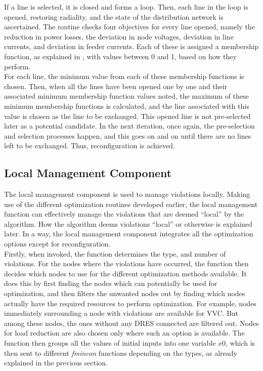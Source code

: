If a line is selected, it is closed and forms a loop. Then, each line in the loop is opened, restoring radiality, and the state of the distribution network is ascertained. The routine checks four objectives for every line opened, namely the reduction in power losses, the deviation in node voltages, deviation in line currents, and deviation in feeder currents. Each of these is assigned a membership function, as explained in , with values between 0 and 1, based on how they perform.\\

For each line, the minimum value from each of these membership functions is chosen. Then, when all the lines have been opened one by one and their associated minimum membership function values noted, the maximum of these minimum membership functions is calculated, and the line associated with this value is chosen as the line to be exchanged. This opened line is not pre-selected later as a potential candidate. In the next iteration, once again, the pre-selection and selection processes happen, and this goes on and on until there are no lines left to be exchanged. Thus, reconfiguration is achieved.

\subsection{Local Management Component}
The local management component is used to manage violations locally. Making use of the different optimization routines developed earlier, the local management function can effectively manage the violations that are deemed ``local'' by the algorithm. How the algorithm deems violations ``local'' or otherwise is explained later. In a way, the local management component integrates all the optimization options except for reconfiguration.\\

Firstly, when invoked, the function determines the type, and number of violations. For the nodes where the violations have occurred, the function then decides which nodes to use for the different optimization methods available. It does this by first finding the nodes which can potentially be used for optimization, and then filters the unwanted nodes out by finding which nodes actually have the required resources to perform optimization. For example, nodes immediately surrounding a node with violations are available for VVC. But among these nodes, the ones without any DRES connected are filtered out. Nodes for load reduction are also chosen only where such an option is available. The function then groups all the values of initial inputs into one variable $x0$, which is then sent to different \emph{fmincon} functions depending on the types, as already explained in the previous section.\\

